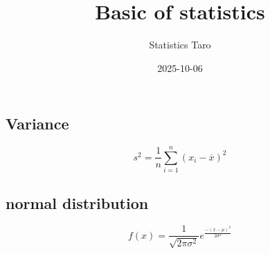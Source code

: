 \documentclass[
  12pt,
  a4paper,
]{extarticle}
\title{Basic of statistics}
\author{Statistics Taro}
\date{2025-10-06}
\begin{document}
\maketitle

\subsection{Variance}\label{variance}

\[
s^2 = \frac{1}{n} \sum_{i=1}^n {(x_i - \overline{x})^2}
\]

\subsection{normal distribution}\label{normal-distribution}

\[
f(x) = \frac{1}{\sqrt{2\pi\sigma^2}}e^\frac{-(x-\mu)^2}{2\sigma^2}
\]
\end{document}
